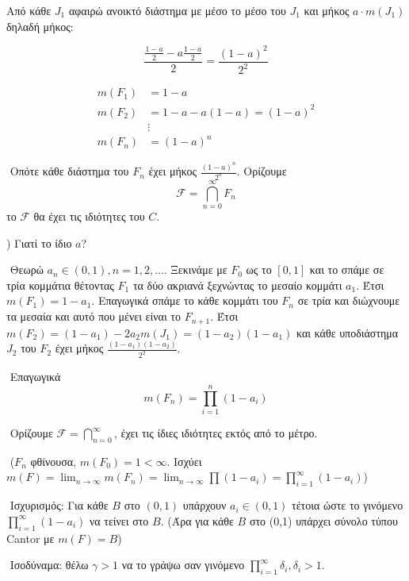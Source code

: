 Από κάθε $J_1$ αφαιρώ ανοικτό διάστημα με μέσο το μέσο του $J_1$ και μήκος $a \cdot m(J_1)$ δηλαδή μήκος:

$$\frac{\frac{1-a}{2} - a \frac{1-a}{2}}{2} = \frac{(1-a)^2}{2^2} $$

\begin{align*}
m(F_1)  & = 1-a \\
m(F_2)  & = 1-a -a(1-a) = (1-a)^2 \\
& \vdots \\
m(F_n) &  = (1-a)^n
\end{align*}

$ $\newline
Οπότε κάθε διάστημα του $F_n$ έχει μήκος $\frac{(1-a)^n}{2^n}$. Ορίζουμε $$\mathcal{F} = \bigcap\limits_{n=0}^{\infty} F_n$$ το $\mathcal{F}$ θα έχει τις ιδιότητες του $C$.

$ $) Γιατί το ίδιο $a$?

$ $\newline
Θεωρώ $a_n \in (0,1), n=1,2,\ldots$. Ξεκινάμε με $F_0$ ως το $[0,1]$ και το σπάμε σε τρία κομμάτια θέτοντας $F_1$ τα δύο ακριανά ξεχνώντας το μεσαίο κομμάτι $a_1$. Έτσι $m(F_1) = 1-a_1$. Επαγωγικά σπάμε το κάθε κομμάτι του $F_n$ σε τρία και διώχνουμε τα μεσαία και αυτό που μένει είναι το $F_{n+1}$. Έτσι $m(F_2) = (1-a_1) - 2 a_2 m(J_1) = (1-a_2)(1-a_1)$ και κάθε υποδιάστημα $J_2$ του $F_2$ έχει μήκος $\frac{(1-a_1)(1-a_2)}{2^2}$.

$ $\newline
Επαγωγικά $$m(F_n) = \prod\limits_{i=1}^n(1-a_i)$$

$ $\newline
Ορίζουμε $\mathcal{F} = \bigcap\limits_{n=0}^{\infty}$, έχει τις ίδιες ιδιότητες εκτός από το μέτρο.

$ $\newline
($F_n$ φθίνουσα, $m(F_0) = 1 < \infty$. Ισχύει $m(F) = \lim_{n\rightarrow \infty} m(F_n) = \lim_{n \rightarrow \infty} \prod (1-a_i) = \prod\limits_{i=1}^{\infty}(1-a_i)$)

$ $\newline
Ισχυρισμός: Για κάθε $B$ στο $(0,1)$ υπάρχουν $a_i \in (0,1)$ τέτοια ώστε το γινόμενο $\prod\limits_{i=1}^{\infty} (1-a_i)$ να τείνει στο $B$. (Άρα για κάθε $B$ στο (0,1) υπάρχει σύνολο τύπου {\eng Cantor} με $m(F) = B$)

$ $\newline
Ισοδύναμα: θέλω $γ >1$ να το γράψω σαν γινόμενο $\prod\limits_{i=1}^{\infty} δ_i, δ_i>1$.

